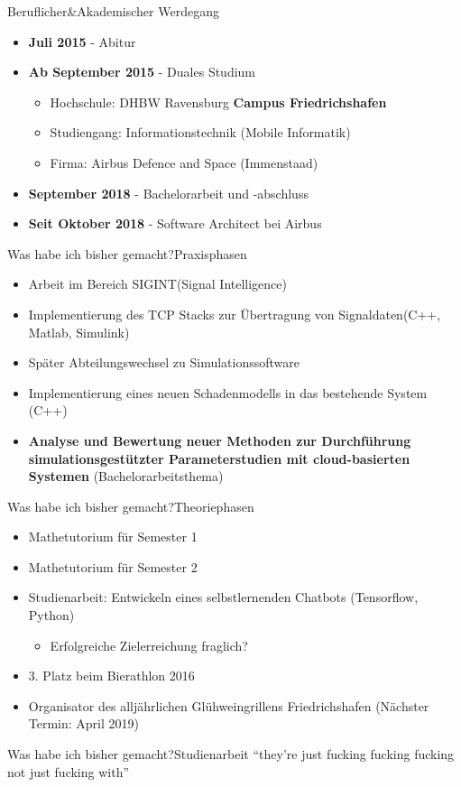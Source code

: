 	\begin{frame}{Beruflicher\&Akademischer Werdegang}{}
		\begin{itemize}
			\item \textbf{Juli 2015} - Abitur
			\item \textbf{Ab September 2015} - Duales Studium
			\begin{itemize}
				\item Hochschule: DHBW Ravensburg \textbf{Campus Friedrichshafen}
				\item Studiengang: Informationstechnik (Mobile Informatik)
				\item Firma: Airbus Defence and Space (Immenstaad)
			\end{itemize}
			\item \textbf{September 2018} - Bachelorarbeit und -abschluss
			\item \textbf{Seit Oktober 2018} - Software Architect bei Airbus
		\end{itemize}
	\end{frame}
	
	\begin{frame}{Was habe ich bisher gemacht?}{Praxisphasen}
			\begin{itemize}
				\item Arbeit im Bereich SIGINT(Signal Intelligence)
				\item Implementierung des TCP Stacks zur Übertragung von Signaldaten(C++, Matlab, Simulink)
				\item Später Abteilungswechsel zu Simulationssoftware
				\item Implementierung eines neuen Schadenmodells in das bestehende System (C++)
				\item \textbf{Analyse und Bewertung neuer Methoden zur Durchführung simulationsgestützter Parameterstudien mit cloud-basierten Systemen} (Bachelorarbeitsthema)
			\end{itemize}
	\end{frame}
	
	\begin{frame}{Was habe ich bisher gemacht?}{Theoriephasen}
		\begin{itemize}
			\item Mathetutorium für Semester 1
			\item Mathetutorium für Semester 2
			\item Studienarbeit: Entwickeln eines selbstlernenden Chatbots (Tensorflow, Python)
			\begin{itemize}
				\item Erfolgreiche Zielerreichung fraglich?
			\end{itemize}
			\item 3. Platz beim Bierathlon 2016
			\item Organisator des alljährlichen Glühweingrillens Friedrichshafen (Nächster Termin: April 2019)
		\end{itemize}
	\end{frame}
	
	\begin{frame}{Was habe ich bisher gemacht?}{Studienarbeit}
		"`they're just fucking fucking fucking not just fucking with"'
	\end{frame}